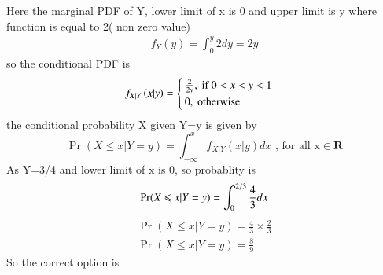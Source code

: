 \documentclass[journal,12pt,twocolumn]{IEEEtran}
\begin{document}
\begin{enumerate}
\begin{equation}
\end{equation}
Here the marginal PDF of Y, lower limit of x is 0 and upper limit is y where  function is equal to 2( non zero value)
\begin{align}
f_Y(y)= \int_{0}^{y}2dy = 2y
\end{align}
so the conditional PDF is 
\begin{align}
f_{X|Y}\left(x|y\right)= \begin{cases}
\frac{2}{2y}, \text{ if } 0<x<y<1\\
0, \text{ otherwise }
\end{cases}
\end{align}
the conditional probability X given Y=y is given by
\begin{equation}
\Pr(X\leqslant x|Y=y)=\int_{-\infty}^{x} f_{X|Y}(x|y)dx \text{ ,  for all x} \in \mathbf{R}  
\end{equation}
As Y=3/4 and lower limit of x is 0, so probablity is 
\begin{equation}
\Pr(X\leqslant x|Y=y)=\int_{0}^{2/3} \frac{4}{3}dx\\
\end{equation}
\begin{align}
\Pr(X\leqslant x|Y=y)=\frac{4}{3}\times \frac{2}{3}\\
\Pr(X\leqslant x|Y=y)=\frac{8}{9} 
\end{align}
So the correct option is 
\end{enumerate}
\end{document}
